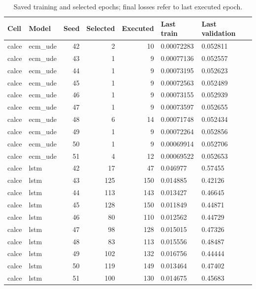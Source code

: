\begin{table}[!t]
\centering
\footnotesize
\caption{Saved training and selected epochs; final losses refer to last executed epoch.}
\label{tab:reviewer-epochs-4}
\setlength{\tabcolsep}{3pt}
\begin{tabular}{llrrr p{} p{}}
\toprule
Cell & Model & Seed & Selected & Executed & Last train & Last validation \\
\midrule
calce & ecm\_ude & 42 & 2 & 10 & 0.00072283 & 0.052811 \\
calce & ecm\_ude & 43 & 1 & 9 & 0.00077136 & 0.052557 \\
calce & ecm\_ude & 44 & 1 & 9 & 0.00073195 & 0.052623 \\
calce & ecm\_ude & 45 & 1 & 9 & 0.00072563 & 0.052489 \\
calce & ecm\_ude & 46 & 1 & 9 & 0.00073155 & 0.052939 \\
calce & ecm\_ude & 47 & 1 & 9 & 0.00073597 & 0.052655 \\
calce & ecm\_ude & 48 & 6 & 14 & 0.00071748 & 0.052434 \\
calce & ecm\_ude & 49 & 1 & 9 & 0.00072264 & 0.052856 \\
calce & ecm\_ude & 50 & 1 & 9 & 0.00069914 & 0.052706 \\
calce & ecm\_ude & 51 & 4 & 12 & 0.00069522 & 0.052653 \\
calce & lstm & 42 & 17 & 47 & 0.046977 & 0.57455 \\
calce & lstm & 43 & 125 & 150 & 0.014885 & 0.42126 \\
calce & lstm & 44 & 113 & 143 & 0.013427 & 0.46645 \\
calce & lstm & 45 & 128 & 150 & 0.011849 & 0.44871 \\
calce & lstm & 46 & 80 & 110 & 0.012562 & 0.44729 \\
calce & lstm & 47 & 98 & 128 & 0.015015 & 0.47326 \\
calce & lstm & 48 & 83 & 113 & 0.015556 & 0.48487 \\
calce & lstm & 49 & 102 & 132 & 0.016756 & 0.44444 \\
calce & lstm & 50 & 119 & 149 & 0.013464 & 0.47402 \\
calce & lstm & 51 & 100 & 130 & 0.014675 & 0.45683 \\
\bottomrule
\end{tabular}
\end{table}
